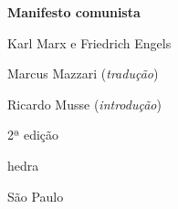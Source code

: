 




\begingroup\thispagestyle{empty}\vspace*{.05\textheight} 

              \formular
              \Huge
              \noindent
              \textbf{Manifesto comunista}
              \medskip  
              
              {\brabo\LARGE
              \noindent Karl Marx e Friedrich Engels}
              \vspace{4cm}

              \newfontfamily{}
              {\fontsize{30}{40}\selectfont \minion\small\noindent Marcus Mazzari (\textit{tradução})}
              \vspace{-0.5cm}

              {\fontsize{30}{40}\selectfont \minion\small\noindent Ricardo Musse (\textit{introdução})}

              \noindent
              {\fontsize{30}{40}\selectfont\minion\small\noindent 2ª edição}

              \vfill

              \newfontfamily{}
              {\noindent\fontsize{30}{40}\selectfont \timesnewroman hedra}

              \vspace{-0.5cm}
              {\selectfont\minion\small\noindent São Paulo \quad\the\year}

\endgroup
\pagebreak
